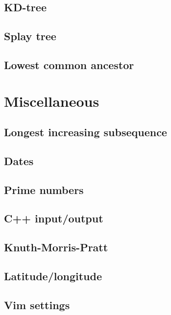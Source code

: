 \subsection{KD-tree}
\raggedbottom
\hrulefill
\subsection{Splay tree}
\raggedbottom
\hrulefill
\subsection{Lowest common ancestor}
\raggedbottom
\hrulefill

\section{Miscellaneous}
\subsection{Longest increasing subsequence}
\raggedbottom
\hrulefill
\subsection{Dates}
\raggedbottom
\hrulefill
\subsection{Prime numbers}
\raggedbottom
\hrulefill
\subsection{C++ input/output}
\raggedbottom
\hrulefill
\subsection{Knuth-Morris-Pratt}
\raggedbottom
\hrulefill
\subsection{Latitude/longitude}
\raggedbottom
\hrulefill
\subsection{Vim settings}
\raggedbottom
\hrulefill


